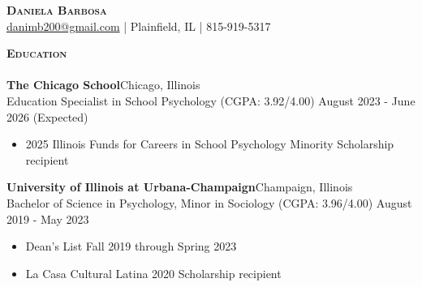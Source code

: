 \documentclass[a4paper]{article}
\newcommand{\lineunder} {
    \vspace*{-8pt} \\
    \hspace*{-18pt} \hrulefill \\
}
\newcommand{\header} [1] {
    {\hspace*{-18pt}\vspace*{6pt} \textsc{#1}}
    \vspace*{-6pt} \lineunder
}
\begin{document}
\vspace*{-40pt}

    

\vspace*{-10pt}
\begin{center}
	{\Huge \scshape \textbf{Daniela Barbosa}}\\
    \href{mailto:danimb200@gmail.com}{danimb200@gmail.com} 
    | Plainfield, IL
    | 815-919-5317

	  
\end{center}

\header{\textbf{Education}}
\textbf{The Chicago School}\hfill Chicago, Illinois \\
Education Specialist in School Psychology (CGPA: 3.92/4.00) \hfill August 2023 - June 2026 (Expected) \\ 
    \begin{itemize}[noitemsep]
        \item 2025 Illinois Funds for Careers in School Psychology Minority Scholarship recipient
    \end{itemize}

    \vspace{1mm}

\textbf{University of Illinois at Urbana-Champaign}\hfill Champaign, Illinois \\
Bachelor of Science in Psychology, Minor in Sociology (CGPA: 3.96/4.00) \hfill August 2019 - May 2023 \\ 
    \begin{itemize}[noitemsep]
        \item Dean’s List Fall 2019 through Spring 2023
        \item La Casa Cultural Latina 2020 Scholarship recipient
    \end{itemize}

\end{document}
